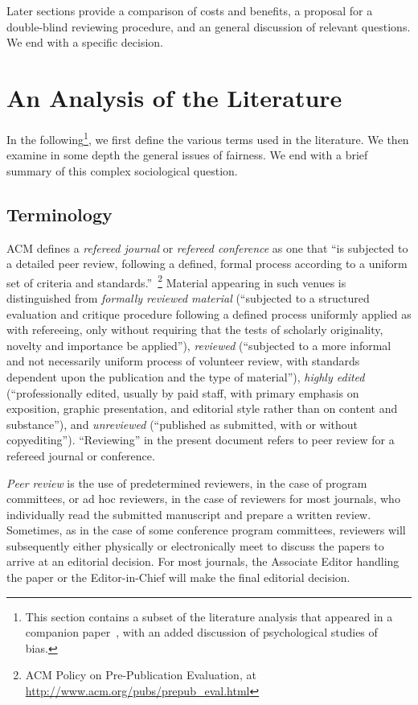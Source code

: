\documentclass[acmtods,acmnow]{acmtrans2m}
\begin{document}
Later sections provide a comparison of costs and benefits, a proposal for
a double-blind reviewing procedure, and an general discussion of relevant
questions. We end with a specific decision.

\section{An Analysis of the Literature}
In the following\footnote{This section contains a subset of the literature analysis that
appeared in a companion paper~\cite{DBR}, with an added discussion of
psychological studies of bias.}, we first define the various terms used in the
literature. We then examine in some depth
the general issues of fairness. We end with a brief summary of this complex
sociological question.

\subsection{Terminology}

ACM defines a {\em refereed journal} or {\em refereed conference} as one
that ``is subjected to a detailed peer review, following a defined, formal
process according to a uniform set of criteria and
standards.''~\footnote{ACM Policy on Pre-Publication Evaluation, at
\url{http://www.acm.org/pubs/prepub_eval.html}} Material appearing in such
venues is distinguished from
{\em formally reviewed material} (``subjected to a structured evaluation and
critique procedure following a defined process uniformly applied as with
refereeing, only without requiring that the tests of scholarly originality,
novelty and importance be applied''), {\em reviewed} (``subjected to a more
informal and not necessarily uniform process of volunteer review, with
standards dependent upon the publication and the type of material''), {\em
highly edited} (``professionally edited, usually by paid staff, with primary
emphasis on exposition, graphic presentation, and editorial style rather
than on content and substance''), and {\em unreviewed} (``published as
submitted, with or without copyediting''). ``Reviewing'' in the present
document refers to peer review for a refereed journal or conference.

{\em Peer review} is the use of predetermined reviewers, in the case of program
committees, or ad hoc reviewers, in the case of reviewers
for most journals, who individually read the submitted
manuscript and prepare a written review. Sometimes, as in the case of some
conference program committees, reviewers will
subsequently either physically or electronically meet to discuss the papers
to arrive at an editorial decision. For most journals, the Associate Editor
handling the paper or the Editor-in-Chief will make the final editorial
decision.
\end{document}
